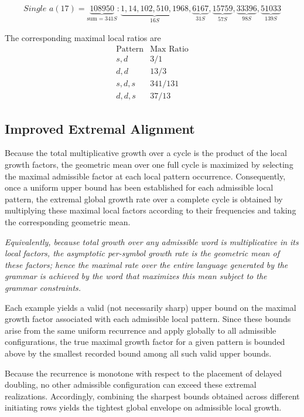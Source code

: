 \documentclass[12pt, oneside]{article}
\numberwithin{equation}{section}
\theoremstyle{definition}
\theoremstyle{plain}
\theoremstyle{remark}
\begin{document}
\[
\begin{array}{l}
\textit{Single } a(17) = \underbrace{108950}_{\text{sum} = 341S}:
\underbrace{1,14,102,510,1968}_{16S},
\underbrace{6167}_{31S},
\underbrace{15759}_{57S},
\underbrace{33396}_{98S},
\underbrace{51033}_{139S}
\end{array}
\]

The corresponding maximal local ratios are
\[
\begin{array}{c|c}
\text{Pattern} & \text{Max Ratio} \\
\hline
s,d & 3/1 \\
d,d & 13/3 \\
s,d,s & 341/131 \\
d,d,s & 37/13
\end{array}
\]

\subsection*{Improved Extremal Alignment}

Because the total multiplicative growth over a cycle is the product of the local
growth factors, the geometric mean over one full cycle is maximized by selecting
the maximal admissible factor at each local pattern occurrence. Consequently,
once a uniform upper bound has been established for each admissible local pattern,
the extremal global growth rate over a complete cycle is obtained by multiplying
these maximal local factors according to their frequencies and taking the
corresponding geometric mean.

\emph{Equivalently, because total growth over any admissible word is multiplicative in
its local factors, the asymptotic per-symbol growth rate is the geometric mean of these
factors;  hence the maximal rate over the entire language generated by the grammar is
achieved by the word that maximizes this mean subject to the grammar constraints.}

Each example yields a valid (not necessarily sharp) upper bound on the maximal growth
factor associated with each admissible local pattern.  Since these bounds arise from
the same uniform recurrence and apply globally to all admissible configurations, the
true maximal growth factor for a given pattern is bounded above by the smallest
recorded bound among all such valid upper bounds.

Because the recurrence is monotone with respect to the placement of delayed doubling,
no other admissible configuration can exceed these extremal realizations.
Accordingly, combining the sharpest bounds obtained across different initiating
rows yields the tightest global envelope on admissible local growth.
\end{document}
